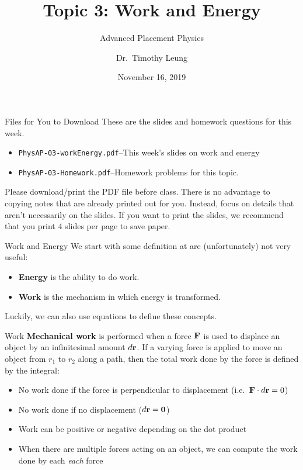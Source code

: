 \documentclass[12pt,compress,aspectratio=169]{beamer}
\title{Topic 3: Work and Energy}
\subtitle{Advanced Placement Physics}
\author[TML]{Dr.\ Timothy Leung}
\institute{Olympiads School, Toronto, ON, Canada}
\date{November 16, 2019}
\newcommand{\mb}[1]{\ensuremath\mathbf{#1}}
\newcommand{\eq}[2]{\vspace{#1}{\Large\begin{displaymath}#2\end{displaymath}}}
\begin{document}
\begin{frame}
  \maketitle
\end{frame}

\begin{frame}{Files for You to Download}
  These are the slides and homework questions for this week.
  \begin{itemize}
  \item\texttt{PhysAP-03-workEnergy.pdf}--This week's slides on work and
    energy
  \item\texttt{PhysAP-03-Homework.pdf}--Homework problems for this topic.
  \end{itemize}
  Please download/print the PDF file before class. There is no advantage to
  copying notes that are already printed out for you. Instead, focus on details
  that aren't necessarily on the slides. If you want to print the slides, we
  recommend that you print 4 slides per page to save paper.
\end{frame}



\begin{frame}{Work and Energy}
  We start with some definition at are (unfortunately) not very useful:
  \begin{itemize}
    \item \textbf{Energy} is the ability to do work.
    \item \textbf{Work} is the mechanism in which energy is transformed.
  \end{itemize}
  Luckily, we can also use equations to define these concepts.
\end{frame}


\begin{frame}{Work}
  \textbf{Mechanical work} is performed when a force $\mb{F}$ is used to
  displace an object by an infinitesimal amount $d\mb{r}$. If a varying force
  is applied to move an object from $r_1$ to $r_2$ along a path, then the total
  work done by the force is defined by the integral:

  \eq{-.35in}{
    \boxed{W=\int_{r_1}^{r_2}\mb{F}(\mb{r})\cdot d\mb{r}}
  }

  \begin{itemize}
  \item No work done if the force is perpendicular to displacement
    (i.e.\ $\mb{F}\cdot d\mb{r}=0$)
  \item No work done if no displacement ($d\mb{r}=\mb{0}$)
  \item Work can be positive or negative depending on the dot product
  \item When there are multiple forces acting on an object, we can compute the
    work done by each \emph{each} force
  \end{itemize}
\end{frame}
\end{document}

